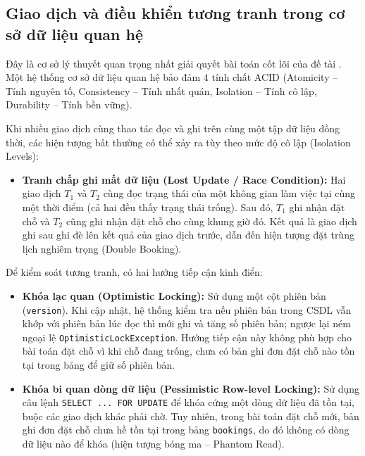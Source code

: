 \subsection{Giao dịch và điều khiển tương tranh trong cơ sở dữ liệu quan hệ}
Đây là cơ sở lý thuyết quan trọng nhất giải quyết bài toán cốt lõi của đề tài \cite{kleppmann2017ddia}. Một hệ thống cơ sở dữ liệu quan hệ bảo đảm 4 tính chất ACID (Atomicity -- Tính nguyên tố, Consistency -- Tính nhất quán, Isolation -- Tính cô lập, Durability -- Tính bền vững).

Khi nhiều giao dịch cùng thao tác đọc và ghi trên cùng một tập dữ liệu đồng thời, các hiện tượng bất thường có thể xảy ra tùy theo mức độ cô lập (Isolation Levels):
\begin{itemize}
    \item \textbf{Tranh chấp ghi mất dữ liệu (Lost Update / Race Condition):} Hai giao dịch $T_1$ và $T_2$ cùng đọc trạng thái của một không gian làm việc tại cùng một thời điểm (cả hai đều thấy trạng thái trống). Sau đó, $T_1$ ghi nhận đặt chỗ và $T_2$ cũng ghi nhận đặt chỗ cho cùng khung giờ đó. Kết quả là giao dịch ghi sau ghi đè lên kết quả của giao dịch trước, dẫn đến hiện tượng đặt trùng lịch nghiêm trọng (Double Booking).
\end{itemize}


Để kiểm soát tương tranh, có hai hướng tiếp cận kinh điển:
\begin{itemize}
    \item \textbf{Khóa lạc quan (Optimistic Locking):} Sử dụng một cột phiên bản (\texttt{version}). Khi cập nhật, hệ thống kiểm tra nếu phiên bản trong CSDL vẫn khớp với phiên bản lúc đọc thì mới ghi và tăng số phiên bản; ngược lại ném ngoại lệ \texttt{OptimisticLockException}. Hướng tiếp cận này không phù hợp cho bài toán đặt chỗ vì khi chỗ đang trống, chưa có bản ghi đơn đặt chỗ nào tồn tại trong bảng để giữ số phiên bản.
    \item \textbf{Khóa bi quan dòng dữ liệu (Pessimistic Row-level Locking):} Sử dụng câu lệnh \texttt{SELECT ... FOR UPDATE} để khóa cứng một dòng dữ liệu đã tồn tại, buộc các giao dịch khác phải chờ. Tuy nhiên, trong bài toán đặt chỗ mới, bản ghi đơn đặt chỗ chưa hề tồn tại trong bảng \texttt{bookings}, do đó không có dòng dữ liệu nào để khóa (hiện tượng bóng ma -- Phantom Read).
\end{itemize}

